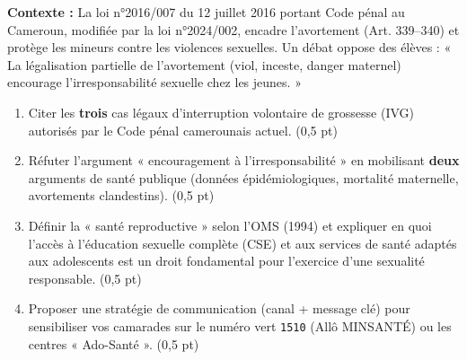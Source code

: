 \documentclass[11pt]{article}
\begin{document}
\begin{exercice}
\textbf{Contexte :} La loi n°2016/007 du 12 juillet 2016 portant Code pénal au Cameroun, modifiée par la loi n°2024/002, encadre l'avortement (Art. 339--340) et protège les mineurs contre les violences sexuelles. Un débat oppose des élèves : « La légalisation partielle de l'avortement (viol, inceste, danger maternel) encourage l'irresponsabilité sexuelle chez les jeunes. »

\begin{enumerate}
    \item Citer les \textbf{trois} cas légaux d'interruption volontaire de grossesse (IVG) autorisés par le Code pénal camerounais actuel. (0,5 pt)
    \item Réfuter l'argument « encouragement à l'irresponsabilité » en mobilisant \textbf{deux} arguments de santé publique (données épidémiologiques, mortalité maternelle, avortements clandestins). (0,5 pt)
    \item Définir la « santé reproductive » selon l'OMS (1994) et expliquer en quoi l'accès à l'éducation sexuelle complète (CSE) et aux services de santé adaptés aux adolescents est un droit fondamental pour l'exercice d'une sexualité responsable. (0,5 pt)
    \item Proposer une stratégie de communication (canal + message clé) pour sensibiliser vos camarades sur le numéro vert \texttt{1510} (Allô MINSANTÉ) ou les centres « Ado-Santé ». (0,5 pt)
\end{enumerate}
\end{exercice}
\end{document}
